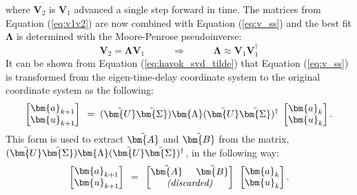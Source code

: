     where $\bm{V}_2$ is $\bm{V}_1$ advanced a single step forward in time.
    The matrices from Equation (\ref{eq:v1v2}) are now combined with Equation (\ref{eq:v_ss}) and the best fit $\bm{\Lambda}$ is determined with the Moore-Penrose pseudoinverse:
    \begin{equation} \label{eq:v_dmd}
        \bm{V}_2 = \bm{\Lambda} \bm{V}_1 \phantom{---} \Rightarrow \phantom{---} \bm{\Lambda} \approx \bm{V}_1 \bm{V}_1^{\dagger}
    \end{equation}
    It can be shown from Equation (\ref{eq:havok_svd_tilde}) that Equation (\ref{eq:v_ss}) is transformed from the eigen-time-delay coordinate system to the original coordinate system as the following:
    \begin{equation} \label{eq:v_ss_a} 
        \begin{bmatrix}
            \bm{a}_{k+1}  \\  \bm{u}_{k+1} 
        \end{bmatrix}
       \phantom{.} = \phantom{.} (\Tilde{\bm{U}} \Tilde{\bm{\Sigma}}) \bm{\Lambda} (\Tilde{\bm{U}}  \Tilde{\bm{\Sigma}})^{\dagger} \phantom{.}
        \begin{bmatrix}
            \bm{a}_{k}  \\  \bm{u}_{k} 
        \end{bmatrix} .
    \end{equation}    
    This form is used to extract $\Tilde{\bm{A}}$ and $\Tilde{\bm{B}}$ from the matrix,
    \( 
        (\Tilde{\bm{U}} \Tilde{\bm{\Sigma}}) \bm{\Lambda} (\Tilde{\bm{U}}  \Tilde{\bm{\Sigma}})^{\dagger}
    \), in the following way:
    \begin{equation} \label{matrix_decomp}
        \begin{bmatrix}
            \bm{a}_{k+1}  \\  \bm{u}_{k+1} 
        \end{bmatrix}
        \phantom{.} = \phantom{.} 
        \begin{bmatrix}
            \Tilde{\bm{A}} \phantom{.....} \Tilde{\bm{B}} \\
            \textit{(discarded)}
        \end{bmatrix}
        \phantom{.}
        \begin{bmatrix}
            \bm{a}_{k}  \\  \bm{u}_{k} 
        \end{bmatrix}.
    \end{equation}    
